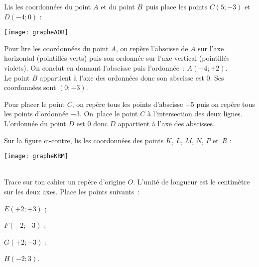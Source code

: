 \begin{methode*1}

\begin{exemple*1}
Lis les coordonnées du point $A$ et du point $B$ puis place les points $C(5 ; -3)$ et $D(-4 ; 0)$ :

\begin{center} \texttt{[image: grapheAOB]} \end{center}

Pour lire les coordonnées du point $A$, on repère l'abscisse de $A$ sur l'axe horizontal (pointillés verts) puis  son ordonnée sur l'axe vertical (pointillés violets). On conclut en donnant l'abscisse puis l'ordonnée : $A (-4 ; +2)$. \\[0.5em]
Le point $B$ appartient à l'axe des ordonnées donc son abscisse est 0. Ses coordonnées sont $(0 ; -3)$.

Pour placer le point $C$, on repère tous les points d'abscisse $+5$ puis on repère tous les points d'ordonnée $-3$. On place le point $C$ à l'intersection des deux lignes. \\[0.5em]
L'ordonnée du point $D$ est 0 donc $D$ appartient à l'axe des abscisses.
\end{exemple*1}

\exercice 

\begin{minipage}[c]{0.45\linewidth}
Sur la figure ci-contre, lis les coordonnées des points $K$, $L$, $M$, $N$, $P$ et $R$ :
 \end{minipage} \hfill%
 \begin{minipage}[c]{0.4\linewidth}
 
 \begin{center} \texttt{[image: grapheKRM]} \end{center}
  \end{minipage} \\

\exercice Trace sur ton cahier un repère d'origine $O$. L'unité de longueur est le centimètre sur les deux axes. Place les points suivants :
\begin{colenumerate}{4}
 \item $E(+2 ; +3)$ ;
 \item $F(-2 ; -3)$ ;
 \item $G(+2 ; -3)$ ;
 \item $H(-2 ; 3)$.
 \end{colenumerate}

\end{methode*1}


